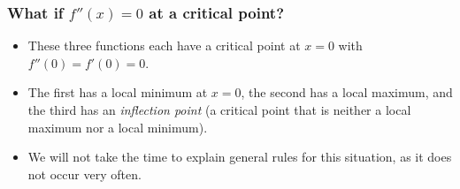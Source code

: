 \documentclass[9pt]{beamer}
\begin{document}
\begin{frame}[t]
 \frametitle{What if $f''(x)=0$ at a critical point?}
 
 \begin{center}
 \end{center}

 \begin{itemize}
  \item<2-> These three functions each have a critical point at $x=0$
   with $f''(0)=f'(0)=0$.
  \item<3-> The first has a local minimum at $x=0$, the second has a
   local maximum, and the third has an \emph{inflection point} (a
   critical point that is neither a local maximum nor a local
   minimum).
  \item<4-> We will not take the time to explain general rules for
   this situation, as it does not occur very often.
 \end{itemize}
\end{frame}
\end{document}
